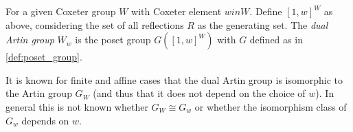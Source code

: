 \documentclass[class=article, crop=false]{standalone}
\begin{document}
\begin{definition}
    For a given Coxeter group $W$ with Coxeter element $w in W$. Define $[1,w]^W$ as above, considering the set of all reflections $R$ as the generating set. The \emph{dual Artin group} $W_w$ is the poset group $G([1,w]^W)$ with $G$ defined as in \cref{def:poset_group}.
\end{definition}

It is known for finite \cite{bessis_dual_2003} and affine \cite{mccammond_sulway_artin_2017} cases that the dual Artin group is isomorphic to the Artin group $G_W$ (and thus that it does not depend on the choice of $w$). In general this is not known whether $G_W \cong G_w$ or whether the isomorphism class of $G_w$ depends on $w$.
\end{document}
